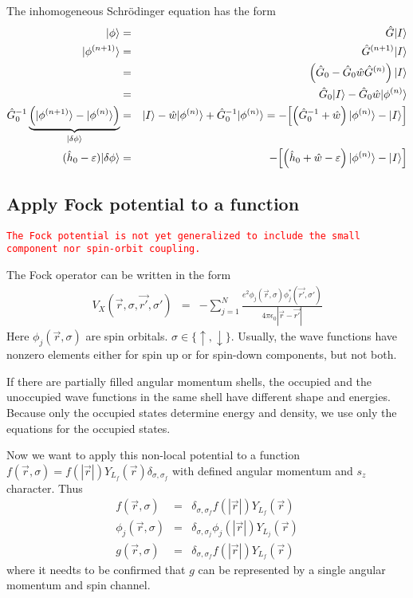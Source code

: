 \documentclass[11pt,a4paper]{report}
\newcommand{\petertt}[1]{\textcolor{red}{\texttt{#1}}}
\begin{document}
The inhomogeneous Schr\"odinger equation has the form
\begin{eqnarray*}
|\phi\rangle&=&\hat{G}|I\rangle
\\
|\phi^{(n+1)}\rangle&=&\hat{G}^{(n+1)}|I\rangle
\\
&=&\left(\hat{G}_0-\hat{G}_0\hat{w}\hat{G}^{(n)}\right)|I\rangle
\\
&=&\hat{G}_0|I\rangle-\hat{G}_0\hat{w}|\phi^{(n)}\rangle
\\
\hat{G}_0^{-1}
\underbrace{\left(|\phi^{(n+1)}\rangle-|\phi^{(n)}\rangle\right)
}_{|\delta\phi\rangle}
&=&
|I\rangle-\hat{w}|\phi^{(n)}\rangle
+\hat{G}_0^{-1}|\phi^{(n)}\rangle
=
-\Bigl[\left(\hat{G}_0^{-1}+\hat{w}\right)|\phi^{(n)}\rangle
-|I\rangle\Bigr]
\\
(\hat{h}_0-\varepsilon)|\delta\phi\rangle&=&-
\Bigl[\left(\hat{h}_0+\hat{w}-\varepsilon\right)|\phi^{(n)}\rangle
-|I\rangle\Bigr]
\end{eqnarray*}




\subsection{Apply Fock potential to a function}
\petertt{The Fock potential is not yet generalized to include the
  small component nor spin-orbit coupling.}



The Fock operator can be written in the form
\begin{eqnarray*}
V_{X}(\vec{r},\sigma,\vec{r'},\sigma')
&=&-\sum_{j=1}^N \frac{e^2 \phi_j(\vec{r},\sigma)\phi^*_j(\vec{r'},\sigma')}
{4\pi\epsilon_0|\vec{r}-\vec{r'}|}
\end{eqnarray*}
Here $\phi_j(\vec{r},\sigma)$ are spin
orbitals. $\sigma\in\{\uparrow,\downarrow\}$. Usually, the wave
functions have nonzero elements either for spin up or for
spin-down components, but not both.

If there are partially filled angular momentum shells, 
the occupied and the unoccupied wave functions in the same shell
have different shape and energies. Because only the occupied states
determine energy and density, we use only the equations for the
occupied states. 

Now we want to apply this non-local potential to a function
$f(\vec{r},\sigma)=f(|\vec{r}|)Y_{L_f}(\vec{r})\delta_{\sigma,\sigma_f}$
with defined angular momentum and $s_z$ character.  Thus
\begin{eqnarray*}
f(\vec{r},\sigma)&=&\delta_{\sigma,\sigma_f}f(|\vec{r}|)Y_{L_f}(\vec{r})
\\
\phi_j(\vec{r},\sigma)&=&\delta_{\sigma,\sigma_j}\phi_j(|\vec{r}|)Y_{L_j}(\vec{r})
\\
g(\vec{r},\sigma)&=&\delta_{\sigma,\sigma_f}f(|\vec{r}|)Y_{L_f}(\vec{r})
\end{eqnarray*}
where it needts to be confirmed that $g$ can be represented by a
single angular momentum and spin channel.
\end{document}
